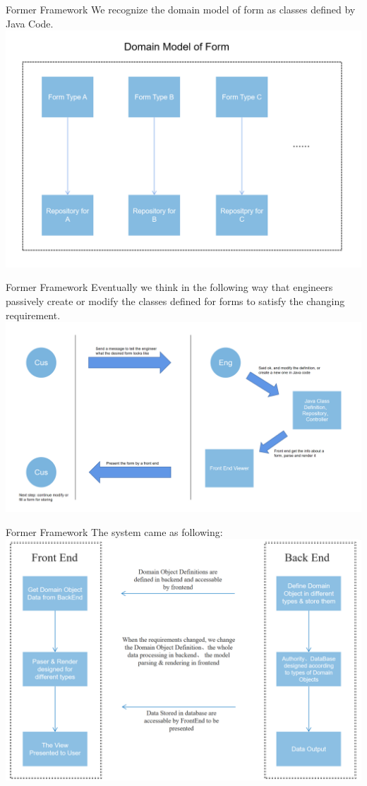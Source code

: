 \documentclass{beamer}
\begin{document}
\begin{frame}{Former Framework}
We recognize the domain model of form as classes defined by Java Code.
\includegraphics[width=0.9\linewidth]{domainform1.png}
\end{frame}

\begin{frame}{Former Framework}
Eventually we think in the following way that engineers passively create or modify the classes defined for forms to satisfy the changing requirement.
\includegraphics[width=0.9\linewidth]{former framework1.png}
    
\end{frame}

\begin{frame}{Former Framework}
The system came as following:
\includegraphics[width=0.9\linewidth]{former framework2.png}
\end{frame}
\end{document}
